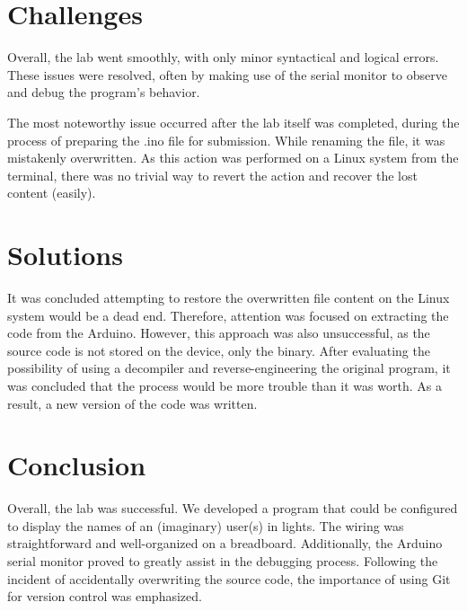 \documentclass[fleqn]{article}
\begin{document}
\section{Challenges}
Overall, the lab went smoothly, with only minor syntactical and logical errors. These issues were resolved, often by making use of the serial monitor to observe and debug the program's behavior.

The most noteworthy issue occurred after the lab itself was completed, during the process of preparing the .ino file for submission. While renaming the file, it was mistakenly overwritten. As this action was performed on a Linux system from the terminal, there was no trivial way to revert the action and recover the lost content (easily). 
\section{Solutions}

It was concluded attempting to restore the overwritten file content on the Linux system would be a dead end. Therefore, attention was focused on extracting the code from the Arduino. However, this approach was also unsuccessful, as the source code is not stored on the device, only the binary. After evaluating the possibility of using a decompiler and reverse-engineering the original program, it was concluded that the process would be more trouble than it was worth. As a result, a new version of the code was written.
\section{Conclusion}
    Overall, the lab was successful. We developed a program that could be configured to display the names of an (imaginary) user(s) in lights. The wiring was straightforward and well-organized on a breadboard. Additionally, the Arduino serial monitor proved to greatly assist in the debugging process. Following the incident of accidentally overwriting the source code, the importance of using Git for version control was emphasized.
\end{document}
